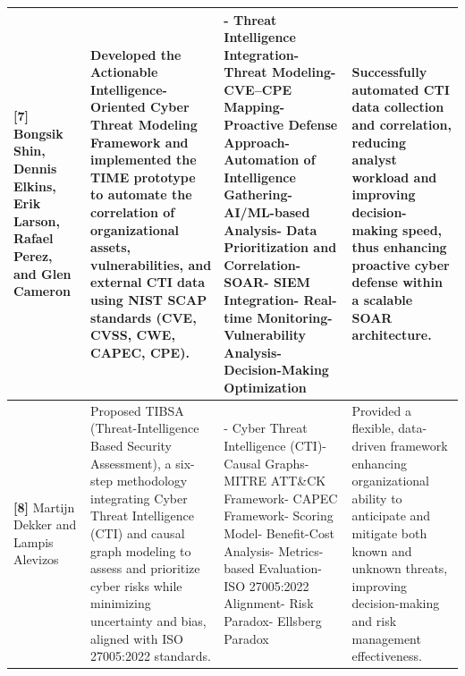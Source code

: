 \begin{scriptsize}
\begin{longtable}{|p{1.8cm}|p{4.2cm}|p{4.0cm}|p{3.8cm}|}
\hline
\textbf{[7]} Bongsik Shin, Dennis Elkins, Erik Larson, Rafael Perez, and Glen Cameron & Developed the Actionable Intelligence-Oriented Cyber Threat Modeling Framework and implemented the TIME prototype to automate the correlation of organizational assets, vulnerabilities, and external CTI data using NIST SCAP standards (CVE, CVSS, CWE, CAPEC, CPE). & - Threat Intelligence Integration\newline - Threat Modeling\newline - CVE--CPE Mapping\newline - Proactive Defense Approach\newline - Automation of Intelligence Gathering\newline - AI/ML-based Analysis\newline - Data Prioritization and Correlation\newline - SOAR\newline - SIEM Integration\newline - Real-time Monitoring\newline - Vulnerability Analysis\newline - Decision-Making Optimization & Successfully automated CTI data collection and correlation, reducing analyst workload and improving decision-making speed, thus enhancing proactive cyber defense within a scalable SOAR architecture. \\
\hline
\textbf{[8]} Martijn Dekker and Lampis Alevizos & Proposed TIBSA (Threat-Intelligence Based Security Assessment), a six-step methodology integrating Cyber Threat Intelligence (CTI) and causal graph modeling to assess and prioritize cyber risks while minimizing uncertainty and bias, aligned with ISO 27005:2022 standards. & - Cyber Threat Intelligence (CTI)\newline - Causal Graphs\newline - MITRE ATT\&CK Framework\newline - CAPEC Framework\newline - Scoring Model\newline - Benefit-Cost Analysis\newline - Metrics-based Evaluation\newline - ISO 27005:2022 Alignment\newline - Risk Paradox\newline - Ellsberg Paradox & Provided a flexible, data-driven framework enhancing organizational ability to anticipate and mitigate both known and unknown threats, improving decision-making and risk management effectiveness. \\

\end{longtable}
\end{scriptsize}
